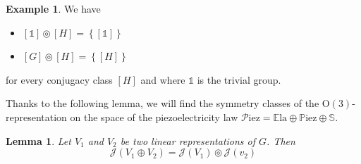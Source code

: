 \documentclass[11pt,a4paper]{amsart}
\newtheorem{lem}[thm]{Lemma}
\theoremstyle{definition}
\newtheorem{exmp}[thm]{Example}
\newcommand{\Ela}{\mathbb{E}\mathrm{la}}    %
\newcommand{\Piez}{\mathbb{P}\mathrm{iez}}  %
\newcommand{\Sym}{\mathbb{S}}               %
\newcommand{\J}{\mathcal{J}}                %
\newcommand{\OO}{\mathrm{O}}                %
\newcommand{\1}{\mathds{1}}		            %
\newcommand{\set}[1]{\left\{#1\right\}}     %
\begin{document}
\begin{exmp}
We have
\begin{itemize}
\item $[\1]\circledcirc [H]=\set{[\1]}$
\item $[G]\circledcirc [H]=\set{[H]}$
\end{itemize}
for every conjugacy class $[H]$ and where $\1$ is the trivial group.
\end{exmp}

Thanks to the following lemma, we will find the symmetry classes of the $\OO(3)$-representation on the space of the piezoelectricity law $\mathcal{P}$iez$=\Ela \oplus \Piez \oplus \Sym$.

\begin{lem}\label{lem:clipslemma}
Let $V_1$ and $V_2$ be two linear representations of $G$. Then
\begin{equation*}
\J(V_1\oplus V_2)=\J(V_1)\circledcirc\J(v_2)
\end{equation*}
\end{lem}

\end{document}
